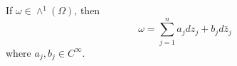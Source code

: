 
If $\omega \in \wedge^1(\Omega)$, then
$$\omega = \sum_{j=1}^{n} a_j dz_j + b_j d\bar{z}_j$$
where $a_j, b_j \in C^\infty$.
